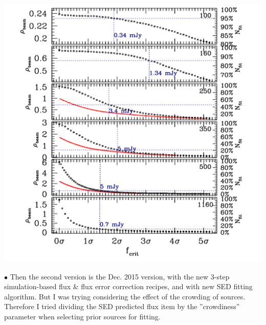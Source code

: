 \documentclass[11pt,a4paper]{article}
\begin{document}
\includegraphics[keepaspectratio=true,width=\textwidth]{galsed_plot_cutting_flux_201412}

\indent\hspace{15pt}$\bullet$ 
Then the second version is the Dec. 2015 version, with the new 3-step simulation-based flux \& flux error correction recipes, and with new SED fitting algorithm. But I was trying considering the effect of the crowding of sources. Therefore I tried dividing the SED predicted flux item by the ''crowdiness'' parameter when selecting prior sources for fitting. 
\end{document}
